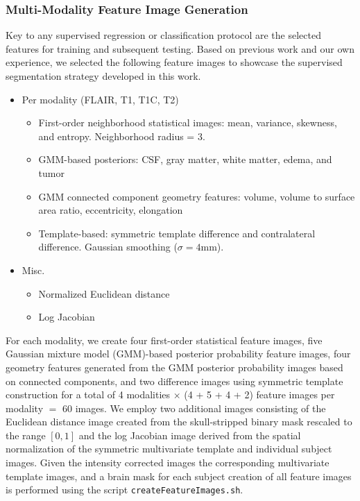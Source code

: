 \documentclass[final,5p,times,twocolumn]{elsarticle}
\begin{document}
\subsubsection{Multi-Modality Feature Image Generation}

Key to any supervised regression or classification protocol are the 
selected features for training and subsequent testing.  Based on previous
work and our own experience, we selected the following feature images
to showcase the supervised segmentation strategy developed in this work.

\begin{itemize}
  \item Per modality (FLAIR, T1, T1C, T2)
    \begin{itemize}
      \item First-order neighborhood statistical images:
            mean, variance, skewness, and entropy. 
            Neighborhood radius = 3.
    \item GMM-based posteriors: CSF, gray matter, white matter, edema, and tumor
    \item GMM connected component geometry features:  volume, volume to 
          surface area ratio, eccentricity, elongation
    \item Template-based:  symmetric template difference and contralateral difference.
          Gaussian smoothing ($\sigma = 4$mm).
    \end{itemize}
  \item Misc.
    \begin{itemize}
    \item Normalized Euclidean distance
    \item Log Jacobian  
    \end{itemize}
\end{itemize}

For each modality, we create four first-order statistical feature images,
five Gaussian mixture model (GMM)-based posterior probability feature images,
four geometry features generated from the GMM posterior probability images
based on connected components, and two difference images using symmetric template
construction for a total of 4 modalities $\times$ (4 + 5 + 4 + 2) feature images per modality $=$ 60 images.  We employ two additional images consisting of the 
Euclidean distance image \cite{maurer2003} created from the skull-stripped 
binary mask rescaled to the range $[0,1]$ and the log
Jacobian image derived from the spatial normalization of the symmetric multivariate template and individual subject images.  Given the intensity corrected images
the corresponding multivariate template images, and a brain mask for each subject
creation of all feature images is performed using the script \verb#createFeatureImages.sh#.
\end{document}
